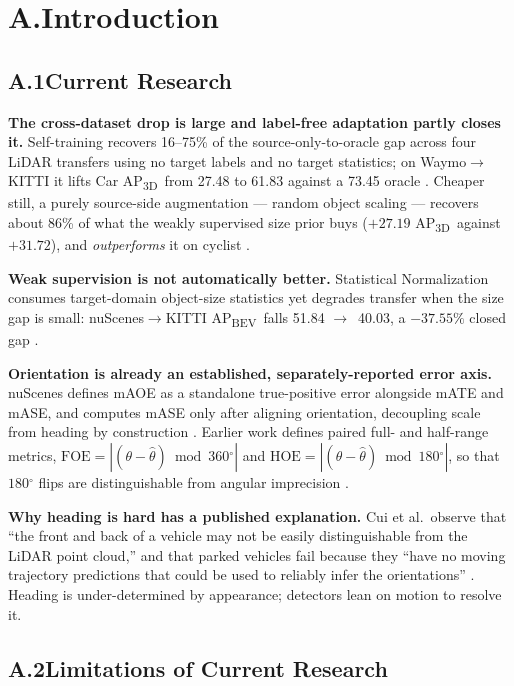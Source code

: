 \documentclass[10pt,letterpaper]{article}
\newcommand{\apthree}{AP\textsubscript{3D}}
\newcommand{\apbev}{AP\textsubscript{BEV}}
\newcommand{\dg}{\ensuremath{^\circ}}
\newcommand{\too}{\ensuremath{\rightarrow}}
\begin{document}
\section{A.\quad Introduction}

\subsection{A.1\quad Current Research}

\textbf{The cross-dataset drop is large and label-free adaptation partly closes it.}
Self-training recovers 16--75\% of the source-only-to-oracle gap across four LiDAR transfers
using no target labels and no target statistics; on Waymo\too KITTI it lifts Car \apthree\ from
27.48 to 61.83 against a 73.45 oracle \cite{st3d}. Cheaper still, a purely source-side
augmentation --- random object scaling --- recovers about 86\% of what the weakly supervised
size prior buys ($+27.19$ \apthree\ against $+31.72$), and \emph{outperforms} it on cyclist
\cite{st3dpp}.

\textbf{Weak supervision is not automatically better.} Statistical Normalization consumes
target-domain object-size statistics yet degrades transfer when the size gap is small:
nuScenes\too KITTI \apbev\ falls 51.84 \too\ 40.03, a $-37.55\%$ closed gap \cite{st3d}.

\textbf{Orientation is already an established, separately-reported error axis.} nuScenes
defines mAOE as a standalone true-positive error alongside mATE and mASE, and computes mASE
only after aligning orientation, decoupling scale from heading by construction
\cite{nuscenes}. Earlier work defines paired full- and half-range metrics,
$\mathrm{FOE} = |(\theta - \hat{\theta}) \bmod 360\dg|$ and
$\mathrm{HOE} = |(\theta - \hat{\theta}) \bmod 180\dg|$, so that $180\dg$ flips are
distinguishable from angular imprecision \cite{cui}.

\textbf{Why heading is hard has a published explanation.} Cui et al.\ observe that ``the front
and back of a vehicle may not be easily distinguishable from the LiDAR point cloud,'' and that
parked vehicles fail because they ``have no moving trajectory predictions that could be used to
reliably infer the orientations'' \cite{cui}. Heading is under-determined by appearance;
detectors lean on motion to resolve it.

\subsection{A.2\quad Limitations of Current Research}
\end{document}
